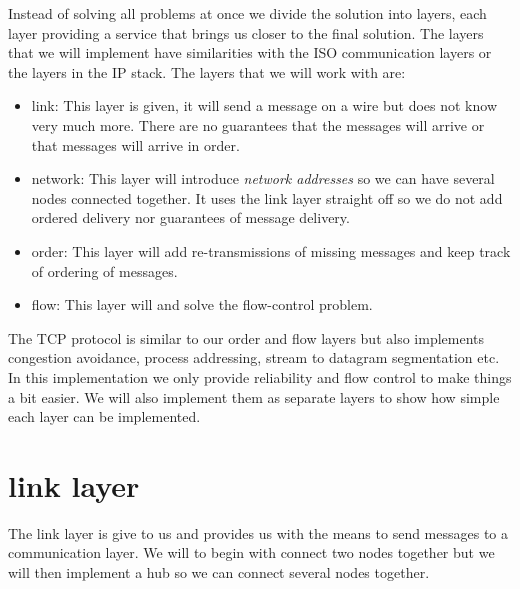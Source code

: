 \documentclass[a4paper,11pt]{article}
\begin{document}
Instead of solving all problems at once we divide the solution into
layers, each layer providing a service that brings us closer to the
final solution. The layers that we will implement have similarities
with the ISO communication layers or the layers in the IP stack. The
layers that we will work with are:

\begin{itemize}

\item link: This layer is given, it will send a message on a
  wire but does not know very much more. There are no guarantees that the
  messages will arrive or that messages will arrive in order.

\item network: This layer will introduce {\em network addresses} so we
  can have several nodes connected together. It uses the link layer
  straight off so we do not add ordered delivery nor guarantees of
  message delivery.

\item order: This layer will add re-transmissions of
  missing messages and keep track of ordering of messages. 
  
\item flow: This layer will and solve the flow-control problem.

\end{itemize}

The TCP protocol is similar to our order and flow layers but also
implements congestion avoidance, process addressing, stream to datagram
segmentation etc. In this implementation we only provide reliability
and flow control to make things a bit easier. We will also implement
them as separate layers to show how simple each layer can be
implemented.

\section{link layer}

The link layer is give to us and provides us with the means to send
messages to a communication layer. We will to begin with connect two
nodes together but we will then implement a hub so we can connect
several nodes together.
\end{document}
